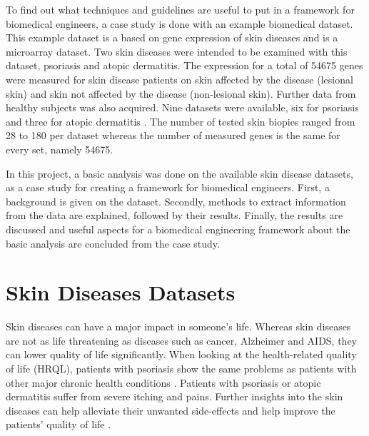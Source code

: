 \documentclass[10pt,a4paper]{report}
\begin{document}
	To find out what techniques and guidelines are useful to put in a framework for biomedical engineers, a case study is done with an example biomedical dataset. This example dataset is a based on gene expression of skin diseases \cite{nair2009genome, suarez2012expanding, bigler2013cross, kim2016spectrum, yao2008type, suarez2011nonlesional, tintle2011reversal, gittler2012progressive} and is a microarray dataset. Two skin diseases were intended to be examined with this dataset, psoriasis and atopic dermatitis. The expression for a total of 54675 genes were measured for skin disease patients on skin affected by the disease (lesional skin) and skin not affected by the disease (non-lesional skin). Further data from healthy subjects was also acquired. Nine datasets were available, six for psoriasis \cite{nair2009genome, suarez2012expanding, bigler2013cross, kim2016spectrum, yao2008type} and three for atopic dermatitis \cite{suarez2011nonlesional, tintle2011reversal, gittler2012progressive}. The number of tested skin biopies ranged from 28 to 180 per dataset whereas the number of measured genes is the same for every set, namely 54675.
	
	In this project, a basic analysis was done on the available skin disease datasets, as a case study for creating a framework for biomedical engineers. First, a background is given on the dataset. Secondly, methods to extract information from the data are explained, followed by their results. Finally, the results are discussed and useful aspects for a biomedical engineering framework about the basic analysis are concluded from the case study.
	
	
	\section{Skin Diseases Datasets}
	\label{sec:SkinDiseasesDataSet}
	
	Skin diseases can have a major impact in someone's life. Whereas skin diseases are not as life threatening as diseases such as cancer, Alzheimer and AIDS, they can lower quality of life significantly. When looking at the health-related quality of life (HRQL), patients with psoriasis show the same problems as patients with other major chronic health conditions \cite{rapp1999psoriasis}. Patients with psoriasis or atopic dermatitis suffer from severe itching and pains. Further insights into the skin diseases can help alleviate their unwanted side-effects and help improve the patients' quality of life \cite{jowett1985skin}.
	
\end{document}
